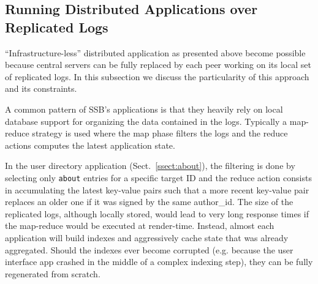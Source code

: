 \documentclass[10pt,sigconf,rewiew]{acmart}
\begin{document}


\subsection{Running Distributed Applications over Replicated Logs}
\label{ssect:dapps}

``Infrastructure-less'' distributed application as presented above
become possible because central servers can be fully replaced by each
peer working on its local set of replicated logs. In this subsection
we discuss the particularity of this approach and its constraints.

A common pattern of SSB's applications is that they heavily rely
on local database support for organizing the data contained in the logs.
Typically a map-reduce strategy is used where the map phase filters
the logs and the reduce actions computes the latest application state.

In the user directory application (Sect.~\ref{ssect:about}), the filtering is
done by selecting only {\tt about} entries for a specific target ID
and the reduce action consists in accumulating the latest key-value
pairs such that a more recent key-value pair replaces an older one if
it was signed by the same author\_id. The size of the replicated logs,
although locally stored, would lead to very long response times if the
map-reduce would be executed at render-time. Instead, almost each
application will build indexes and aggressively cache state that was
already aggregated. Should the indexes ever become corrupted
(e.g. because the user interface app crashed in the middle of a
complex indexing step), they can be fully regenerated from scratch.
\end{document}
